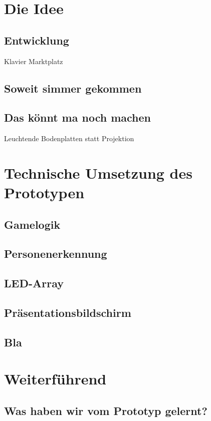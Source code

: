 






\tableofcontents
\clearpage


\section{Die Idee}
\subsection{Entwicklung}
Klavier Marktplatz
\subsection{Soweit simmer gekommen}
\subsection{Das könnt ma noch machen}
Leuchtende Bodenplatten statt Projektion

\section{Technische Umsetzung des Prototypen}
\subsection{Gamelogik}
\subsection{Personenerkennung}
\subsection{LED-Array}
\subsection{Präsentationsbildschirm}
\subsection{Bla}

\section{Weiterführend}
\subsection{Was haben wir vom Prototyp gelernt?}

